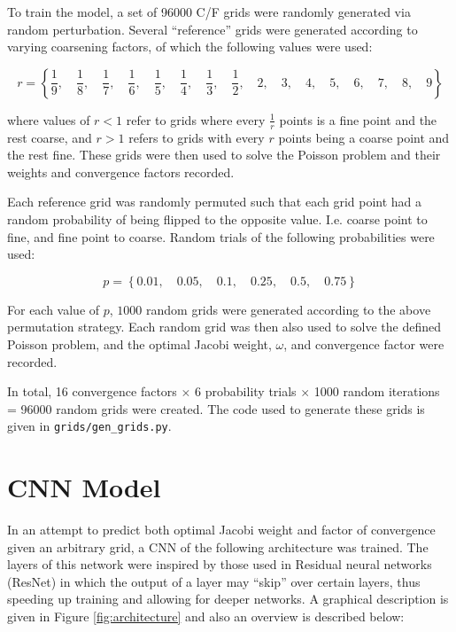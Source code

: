 To train the model, a set of 96000 C/F grids were randomly generated via random perturbation.  Several ``reference'' grids were generated according to varying coarsening factors, of which the following values were used:

$$r = \left\{
\frac{1}{9},\quad
\frac{1}{8},\quad
\frac{1}{7},\quad
\frac{1}{6},\quad
\frac{1}{5},\quad
\frac{1}{4},\quad
\frac{1}{3},\quad
\frac{1}{2},\quad
2,\quad
3,\quad
4,\quad
5,\quad
6,\quad
7,\quad
8,\quad
9
\right\}$$

where values of $r<1$ refer to grids where every $\frac{1}{r}$ points is a fine point and the rest coarse, and $r>1$ refers to grids with every $r$ points being a coarse point and the rest fine.  These grids were then used to solve the Poisson problem and their weights and convergence factors recorded.

Each reference grid was randomly permuted such that each grid point had a random probability of being flipped to the opposite value.  I.e. coarse point to fine, and fine point to coarse.  Random trials of the following probabilities were used:

$$ p = \left\{0.01, \quad 0.05, \quad 0.1, \quad 0.25, \quad 0.5, \quad 0.75\right\} $$

For each value of $p$, $1000$ random grids were generated according to the above permutation strategy.  Each random grid was then also used to solve the defined Poisson problem, and the optimal Jacobi weight, $\omega$, and convergence factor were recorded.

In total, 16 convergence factors $\times$ 6 probability trials $\times$ 1000 random iterations = 96000 random grids were created.  The code used to generate these grids is given in \texttt{grids/gen\_grids.py}.

\section{CNN Model}

In an attempt to predict both optimal Jacobi weight and factor of convergence given an arbitrary grid, a CNN of the following architecture was trained.  The layers of this network were inspired by those used in Residual neural networks (ResNet) in which the output of a layer may ``skip'' over certain layers, thus speeding up training and allowing for deeper networks.  A graphical description is given in Figure \ref{fig:architecture} and also an overview is described below:

